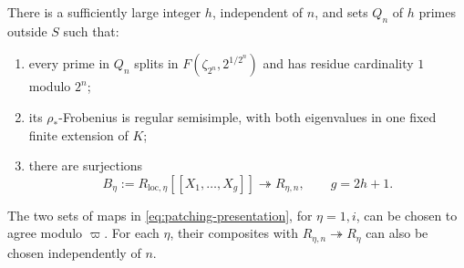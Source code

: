 \begin{lemma}\label{lem:auxiliary-primes}
There is a sufficiently large integer $h$, independent of $n$, and
sets $Q_n$ of $h$ primes outside $S$ such that:
\begin{enumerate}
\item every prime in $Q_n$ splits in
$F(\zeta_{2^n},2^{1/2^n})$ and has residue cardinality $1$ modulo $2^n$;
\item its $\rho_*$-Frobenius is regular semisimple, with both eigenvalues
in one fixed finite extension of $K$;
\item there are surjections
\begin{equation}\label{eq:patching-presentation}
 B_\eta:=R_{\mathrm{loc},\eta}[[X_1,\ldots,X_g]]
 \twoheadrightarrow R_{\eta,n},\qquad g=2h+1.
\end{equation}
\end{enumerate}
The two sets of maps in \eqref{eq:patching-presentation}, for $\eta=1,i$,
can be chosen to agree modulo $\varpi$. For each \(\eta\), their
composites with \(R_{\eta,n}\twoheadrightarrow R_\eta\) can also be
chosen independently of \(n\).
\end{lemma}

